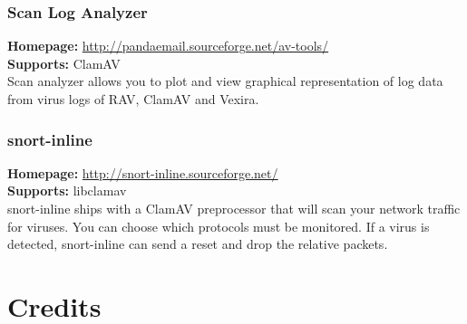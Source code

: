 \documentclass[a4paper,titlepage,12pt]{article}
\begin{document}
    \subsubsection{Scan Log Analyzer}
    \textbf{Homepage:} \url{http://pandaemail.sourceforge.net/av-tools/}\\
    \textbf{Supports:} ClamAV\\[4pt]
    Scan analyzer allows you to plot and view graphical representation of
    log data from virus logs of RAV, ClamAV and Vexira. 

    \subsubsection{snort-inline}
    \textbf{Homepage:} \url{http://snort-inline.sourceforge.net/}\\
    \textbf{Supports:} libclamav\\[4pt]
    snort-inline ships with a ClamAV preprocessor that will scan your network
    traffic for viruses. You can choose which protocols must be monitored. If
    a virus is detected, snort-inline can send a reset and drop the relative
    packets.

    \section{Credits}
\end{document}
